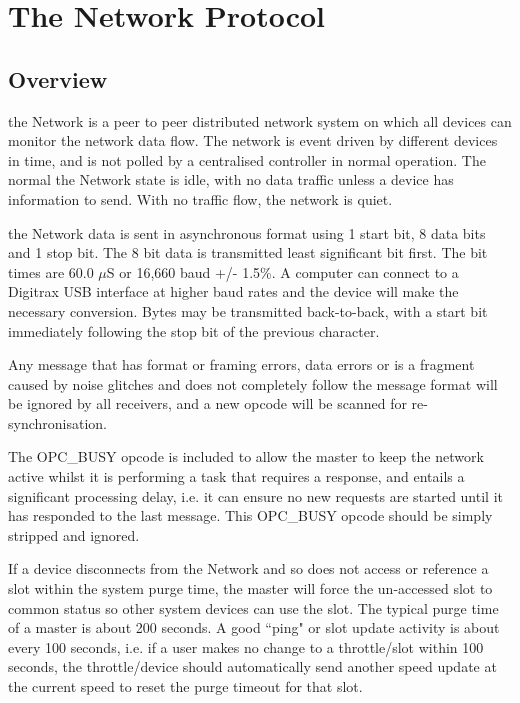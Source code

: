  

\chapter[Network Protocol]{The Network Protocol}

\section{Overview}

the Network is a peer to peer distributed network system on which all devices can monitor the network data flow. The network is event driven by different devices in time, and is not polled by a centralised controller in normal operation. The normal the Network state is idle, with no data traffic unless a device has information to send. With no traffic flow, the network is quiet.

the Network data is sent in asynchronous format using 1 start bit, 8 data bits and 1 stop bit. The 8 bit data is transmitted least significant bit first. The bit times are 60.0 $\mu$S or 16,660 baud +/- 1.5\%. A computer can connect to a Digitrax USB interface at higher baud rates and the device will make the necessary conversion. Bytes may be transmitted back-to-back, with a start bit immediately following the stop bit of the previous character. 

Any message that has format or framing errors, data errors or is a fragment caused by noise glitches and does not completely follow the message format will be ignored by all receivers, and a new opcode will be scanned for re-synchronisation.

The OPC\_BUSY opcode is included to allow the master to keep the network active whilst it is performing a task that requires a response, and entails a significant processing delay, i.e. it can ensure no new requests are started until it has responded to the last message. This OPC\_BUSY opcode should be simply stripped and ignored.

If a device disconnects from the Network and so does not access or reference a slot within the system purge time, the master will force the un-accessed slot to common status so other system devices can use the slot. The typical purge time of a master is about 200 seconds. A good ``ping" or slot update activity is about every 100 seconds, i.e. if a user makes no change to a throttle/slot within 100 seconds, the throttle/device should automatically send another speed update at the current speed to reset the purge timeout for that slot.

